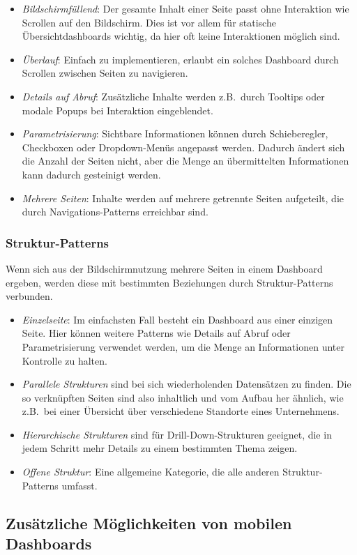 \begin{itemize}
    \item \emph{Bildschirmfüllend}: Der gesamte Inhalt einer Seite passt ohne Interaktion wie Scrollen auf den Bildschirm.
    Dies ist vor allem für statische Übersichtdashboards wichtig, da hier oft keine Interaktionen möglich sind.
    \item \emph{Überlauf}: Einfach zu implementieren, erlaubt ein solches Dashboard durch Scrollen zwischen Seiten zu navigieren.
    \item \emph{Details auf Abruf}: Zusätzliche Inhalte werden z.B.\ durch Tooltips oder modale Popups bei Interaktion eingeblendet.
    \item \emph{Parametrisierung}: Sichtbare Informationen können durch Schieberegler, Checkboxen oder Dropdown-Menüs angepasst werden.
    Dadurch ändert sich die Anzahl der Seiten nicht, aber die Menge an übermittelten Informationen kann dadurch gesteinigt werden.
    \item \emph{Mehrere Seiten}: Inhalte werden auf mehrere getrennte Seiten aufgeteilt, die durch Navigations-Patterns erreichbar sind.
\end{itemize}

\subsubsection{Struktur-Patterns}

Wenn sich aus der Bildschirmnutzung mehrere Seiten in einem Dashboard ergeben, werden diese mit bestimmten Beziehungen durch Struktur-Patterns verbunden.

\begin{itemize}
    \item \emph{Einzelseite}: Im einfachsten Fall besteht ein Dashboard aus einer einzigen Seite.
    Hier können weitere Patterns wie Details auf Abruf oder Parametrisierung verwendet werden, um die Menge an Informationen unter Kontrolle zu halten.
    \item \emph{Parallele Strukturen} sind bei sich wiederholenden Datensätzen zu finden.
    Die so verknüpften Seiten sind also inhaltlich und vom Aufbau her ähnlich, wie z.B.\ bei einer Übersicht über verschiedene Standorte eines Unternehmens.
    \item \emph{Hierarchische Strukturen} sind für Drill-Down-Strukturen geeignet, die in jedem Schritt mehr Details zu einem bestimmten Thema zeigen.
    \item \emph{Offene Struktur}: Eine allgemeine Kategorie, die alle anderen Struktur-Patterns umfasst.
\end{itemize}

\subsection{Zusätzliche Möglichkeiten von mobilen Dashboards}\label{subsec:additional-capabilities-of-mobile-dashboards}

